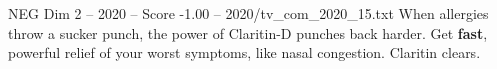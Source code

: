 \begin{textsample}{NEG Dim 2 – 2020 – Score -1.00 – 2020/tv\_com\_2020\_15.txt}  \label{ex:f2_neg_034}
When allergies throw a sucker punch, the power of Claritin-D punches back harder.
Get \textbf{fast}, powerful relief of your worst symptoms, like nasal congestion.
Claritin clears.

\end{textsample}
